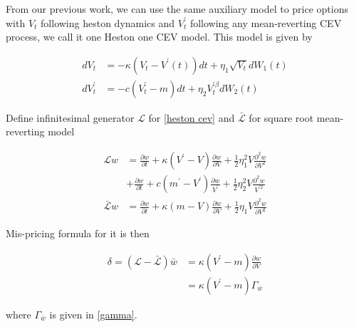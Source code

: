 From our previous work, we can use the same auxiliary model to price options with $V_t$ following heston dynamics and $V^{\prime}_t$ following any mean-reverting CEV process, we call it one Heston one CEV model. This model is given by

\begin{equation}\label{heston cev}
    \begin{aligned}
        d V_t &=-\kappa\left(V_t-V^{\prime}(t)\right) d t+\eta_{1} \sqrt{V_t} d W_1(t) \\
        d V^{\prime}_t &=-c\left(V^{\prime}_t-m\right) d t+\eta_{2} V^{\prime \beta}_t d W_{2}(t)
    \end{aligned}
\end{equation}

Define infinitesimal generator $\mathcal{L}$ for \eqref{heston cev} and $\bar{\mathcal{L}}$ for square root mean-reverting model

\begin{equation}\label{inf gen2}
    \begin{aligned}
        \mathcal{L} w&= \frac{\partial w}{\partial t}+\kappa(V^{\prime} - V) \frac{\partial w}{\partial V}+\frac{1}{2} \eta_1^{2} V \frac{\partial^{2} w}{\partial V^{2}} \\
        &+ \frac{\partial w}{\partial t}+c(m^{\prime} - V^{\prime}) \frac{\partial w}{V^{\prime}}+\frac{1}{2} \eta_2^{2} V \frac{\partial^{2} w}{V^{\prime 2}}\\
        \bar{\mathcal{L}} w &= \frac{\partial w}{\partial t}+\kappa(m - V) \frac{\partial w}{\partial V}+\frac{1}{2} \eta_1 V \frac{\partial^{2} w}{\partial V^{2}}
    \end{aligned}
\end{equation}

\noindent Mis-pricing formula for it is then

$$
\begin{aligned}
    \delta = (\mathcal{L} - \bar{\mathcal{L}}) \bar{w} &= \kappa(V^{\prime}-m)\frac{\partial w}{\partial V} \\
    &= \kappa(V^{\prime}-m) \Gamma_{\bar{w}}
\end{aligned}
$$

\noindent where $\Gamma_{\bar{w}}$ is given in \eqref{gamma}.